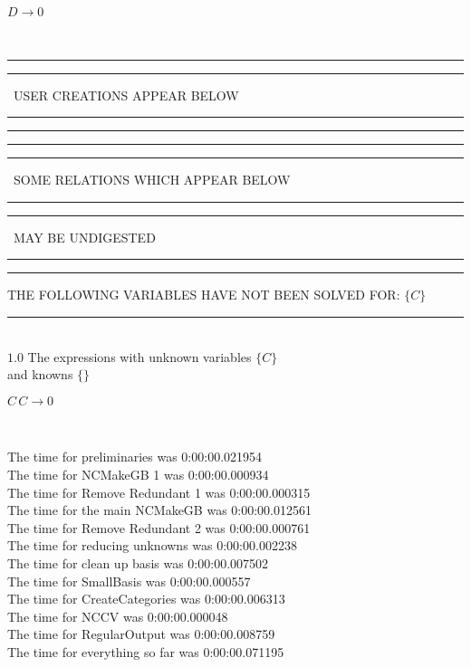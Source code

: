 \documentclass[rep10,leqno]{report}
\begin{document}
\begin{minipage}{6in}
$
D\rightarrow 0
$
\end{minipage}\medskip\\
\rule[2pt]{6in}{1pt}\hfil\break
\rule[2.5pt]{1.701in}{1pt}
\ USER CREATIONS APPEAR BELOW\ 
\rule[2.5pt]{1.701in}{1pt}\hfil\break
\rule[2pt]{6in}{1pt}\hfil\break
\rule[2pt]{6in}{4pt}\hfil\break
\rule[2pt]{1.45in}{4pt}
\ SOME RELATIONS WHICH APPEAR BELOW\ 
\rule[2pt]{1.45in}{4pt}\hfil\break
\rule[2pt]{2.18in}{4pt}
\ MAY BE UNDIGESTED\ 
\rule[2pt]{2.18in}{4pt}\hfil\break
\rule[2pt]{6in}{4pt}\hfil\break
THE FOLLOWING VARIABLES HAVE NOT BEEN SOLVED FOR:\hfil\break
$\{C\}$
\smallskip\\
\rule[3pt]{6in}{.7pt}\\
$1.0$  The expressions with unknown variables $\{C\}$\\
and knowns $\{\}$\smallskip\\
\begin{minipage}{6in}
$
C\,
 C\rightarrow 0
$
\end{minipage}\\
\vspace{10pt}

\noindent
The time for preliminaries was 0:00:00.021954\\
The time for NCMakeGB 1 was 0:00:00.000934\\
The time for Remove Redundant 1 was 0:00:00.000315\\
The time for the main NCMakeGB was 0:00:00.012561\\
The time for Remove Redundant 2 was 0:00:00.000761\\
The time for reducing unknowns was 0:00:00.002238\\
The time for clean up basis was 0:00:00.007502\\
The time for SmallBasis was 0:00:00.000557\\
The time for CreateCategories was 0:00:00.006313\\
The time for NCCV was 0:00:00.000048\\
The time for RegularOutput was 0:00:00.008759\\
The time for everything so far was 0:00:00.071195\\
\end{document}
